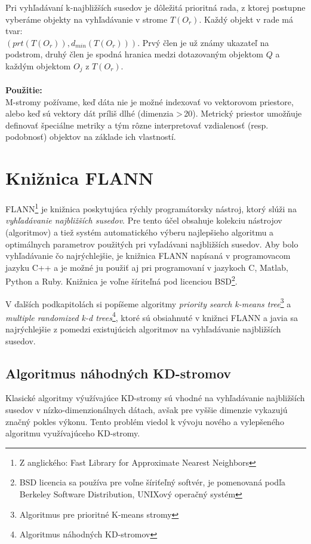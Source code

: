 \documentclass[12pt,oneside]{fithesis2}
\begin{document}
Pri vyhľadávaní k-najbližších susedov je dôležitá prioritná rada, z ktorej postupne vyberáme objekty na vyhľadávanie v strome $T(O_r)$. Každý objekt v rade má tvar:\\ $(prt(T(O_r)), d_{min}(T(O_r)))$. Prvý člen je už známy ukazateľ na podstrom, druhý člen je spodná hranica medzi dotazovaným objektom $Q$ a každým objektom $O_j$ z $T(O_r)$.
\\ \\
\textbf{Použitie:} \\
M-stromy požívame, keď dáta nie je možné indexovať vo vektorovom priestore, alebo keď sú vektory dát príliš dlhé (dimenzia \textgreater \,20). Metrický priestor umožňuje definovať špeciálne metriky a tým rôzne interpretovať vzdialenosť (resp. podobnosť) objektov na základe ich vlastností.

	\chapter{Knižnica FLANN}
	FLANN\footnote{Z anglického: Fast Library for Approximate Nearest Neighbors} je knižnica poskytujúca rýchly programátorsky nástroj, ktorý slúži na \textit{vyhľadávanie najbližších susedov}. Pre tento účel obsahuje kolekciu nástrojov (algoritmov) a tiež systém automatického výberu najlepšieho algoritmu a optimálnych parametrov použitých pri vyľadávani najbližších susedov. Aby bolo vyhľadávanie čo najrýchlejšie, je knižnica FLANN napísaná v programovacom jazyku C++ a je možné ju použiť aj pri programovaní v jazykoch C, Matlab, Python a Ruby. Knižnica je voľne šíriteľná pod licenciou BSD\footnote{BSD licencia sa používa pre voľne šíriťeľný softvér, je pomenovaná podľa Berkeley Software Distribution, UNIXový operačný systém}.\cite{flann_pami_2014}
	
V ďalších podkapitolách si popíšeme algoritmy \textit{priority search
k-means tree}\footnote{Algoritmus pre prioritné K-means stromy} a \textit{multiple randomized k-d trees}\footnote{Algoritmus náhodných KD-stromov}, ktoré sú obsiahnuté v knižnci FLANN a javia sa najrýchlejšie z pomedzi existujúcich algoritmov na vyhľadávanie najbližších susedov.
	\section{Algoritmus náhodných KD-stromov}
Klasické algoritmy výužívajúce KD-stromy sú vhodné na vyhľadávanie najbližších susedov v nízko-dimenzionálnych dátach, avšak pre vyššie dimenzie vykazujú značný pokles výkonu. Tento problém viedol k vývoju nového a vylepšeného algoritmu využívajúceho KD-stromy. \cite{flann_pami_2014}	
	
\end{document}
